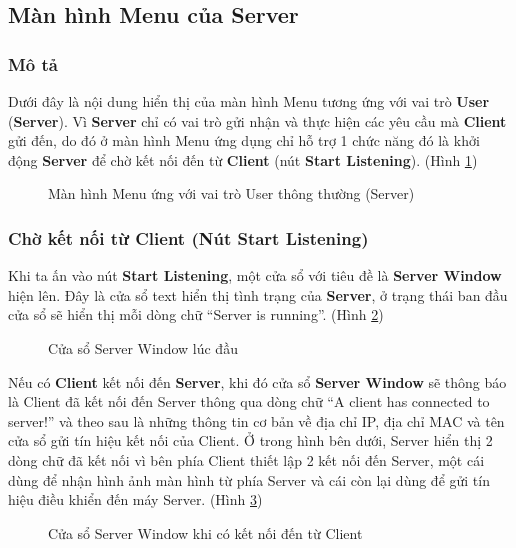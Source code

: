 \subsection{Màn hình Menu của Server}
\subsubsection{Mô tả}
Dưới đây là nội dung hiển thị của màn hình Menu tương ứng với vai trò \textbf{User} (\textbf{Server}). Vì \textbf{Server} chỉ có vai trò gửi nhận và thực hiện các yêu cầu mà \textbf{Client} gửi đến, do đó ở màn hình Menu ứng dụng chỉ hỗ trợ 1 chức năng đó là khởi động \textbf{Server} để chờ kết nối đến từ \textbf{Client} (nút \textbf{Start Listening}). (Hình \ref{fig:ServerMenuWindow})
\begin{figure}[H]
	\caption{Màn hình Menu ứng với vai trò User thông thường (Server)}
	\label{fig:ServerMenuWindow}
\end{figure}

\subsubsection{Chờ kết nối từ Client (Nút Start Listening)}
Khi ta ấn vào nút \textbf{Start Listening}, một cửa sổ với tiêu đề là \textbf{Server Window} hiện lên. Đây là cửa sổ text hiển thị tình trạng của \textbf{Server}, ở trạng thái ban đầu cửa sổ sẽ hiển thị mỗi dòng chữ ``Server is running''. (Hình \ref{fig:ServerLoggerWindow})
\begin{figure}[H]
	\caption{Cửa sổ Server Window lúc đầu}
	\label{fig:ServerLoggerWindow}
\end{figure}

Nếu có \textbf{Client} kết nối đến \textbf{Server}, khi đó cửa sổ \textbf{Server Window} sẽ thông báo là Client đã kết nối đến Server thông qua dòng chữ ``A client has connected to server!'' và theo sau là những thông tin cơ bản về địa chỉ IP, địa chỉ MAC và tên cửa sổ gửi tín hiệu kết nối của Client. Ở trong hình bên dưới, Server hiển thị 2 dòng chữ đã kết nối vì bên phía Client thiết lập 2 kết nối đến Server, một cái dùng để nhận hình ảnh màn hình từ phía Server và cái còn lại dùng để gửi tín hiệu điều khiển đến máy Server. (Hình \ref{fig:ServerWindowConnected})
\begin{figure}[H]
	\caption{Cửa sổ Server Window khi có kết nối đến từ Client}
	\label{fig:ServerWindowConnected}
\end{figure}

